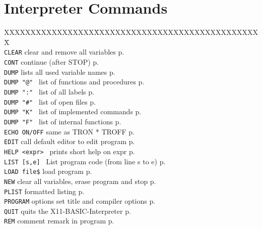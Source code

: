 \section{Interpreter Commands}

\begin{tabbing}
XXXXXXXXXXXXXXXXX\=XXXXXXXXXXXXXXXXXXXXXXXXXXXXXXXX\=\kill\\
\verb|CLEAR|        \> clear and remove all variables  \> p.\pageref{CLEAR}\\
\verb|CONT|         \> continue (after STOP)           \> p.\pageref{CONTINUE}\\
\verb|DUMP|	    \> lists all used variable names   \> p.\pageref{DUMP}\\
{\tt DUMP "@"	   }\> list of functions and procedures\> p.\pageref{DUMP}\\
{\tt DUMP ":"	   }\> list of all labels              \> p.\pageref{DUMP}\\
{\tt DUMP "\#"	   }\> list of open files              \> p.\pageref{DUMP}\\
{\tt DUMP "K"	   }\> list of implemented commands    \> p.\pageref{DUMP}\\
{\tt DUMP "F"	   }\> list of internal functions      \> p.\pageref{DUMP}\\
\verb|ECHO ON/OFF|  \> same as TRON * TROFF             \> p.\pageref{ECHO}\\
\verb|EDIT|	    \> call default editor to edit program\> p.\pageref{EDIT}\\
{\tt HELP <expr>   }\> prints short help on expr       \> p.\pageref{HELP}\\
{\tt LIST [s,e]	   }\> List program code (from line s to e)\> p.\pageref{LIST}\\
\verb|LOAD file$|   \> load program                     \> p.\pageref{LOAD}\\
\verb|NEW|          \> clear all variables, erase program and stop\> p.\pageref{NEW}\\
\verb|PLIST|	    \> formatted listing		  \> p.\pageref{PLIST}\\
\verb|PROGRAM| options   \>set title and compiler options \> p.\pageref{PROGRAM}\\
\verb|QUIT|         \> quits the X11-BASIC-Interpreter \> p.\pageref{QUIT}\\
\verb|REM| comment  \> remark in program                \> p.\pageref{REMbABBREVpbh}\\

\end{tabbing}
